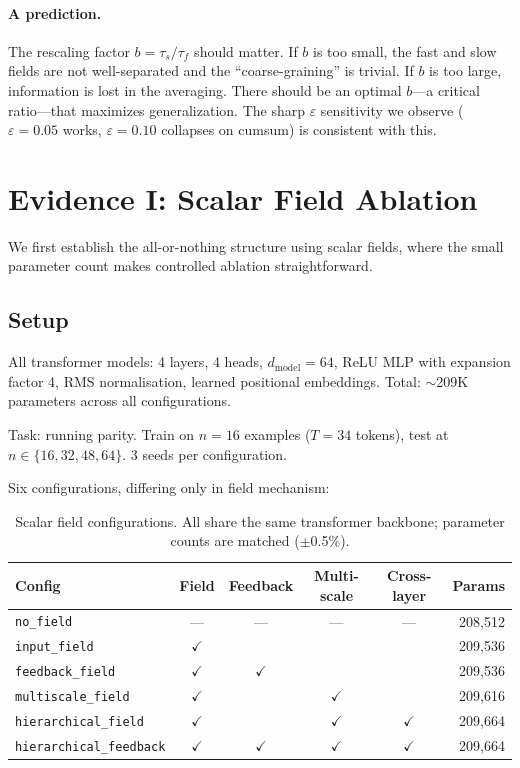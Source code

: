 \documentclass[11pt,a4paper]{article}
\newcommand{\evap}{\varepsilon}
\begin{document}
\paragraph{A prediction.}  The rescaling factor
$b = \tau_s/\tau_f$ should matter.  If $b$ is too small, the fast
and slow fields are not well-separated and the ``coarse-graining''
is trivial.  If $b$ is too large, information is lost in the
averaging.  There should be an optimal $b$---a critical ratio---that
maximizes generalization.  The sharp $\evap$ sensitivity we observe
($\evap = 0.05$ works, $\evap = 0.10$ collapses on cumsum) is
consistent with this.


\section{Evidence I: Scalar Field Ablation}
\label{sec:scalar-ablation}

We first establish the all-or-nothing structure using scalar fields,
where the small parameter count makes controlled ablation
straightforward.

\subsection{Setup}

All transformer models: 4 layers, 4 heads, $d_{\mathrm{model}} = 64$,
ReLU MLP with expansion factor 4, RMS normalisation, learned
positional embeddings.  Total: $\sim$209K parameters across all
configurations.

Task: running parity.  Train on $n = 16$ examples ($T = 34$ tokens),
test at $n \in \{16, 32, 48, 64\}$.  3 seeds per configuration.

Six configurations, differing only in field mechanism:

\begin{table}[h]
\centering
\caption{Scalar field configurations.  All share the same transformer
  backbone; parameter counts are matched ($\pm$0.5\%).}
\label{tab:scalar-configs}
\begin{tabular}{@{}lccccr@{}}
\toprule
Config & Field & Feedback & Multi-scale & Cross-layer & Params \\
\midrule
\texttt{no\_field}     & --- & --- & --- & --- & 208,512 \\
\texttt{input\_field}  & $\checkmark$ & & & & 209,536 \\
\texttt{feedback\_field} & $\checkmark$ & $\checkmark$ & & & 209,536 \\
\texttt{multiscale\_field} & $\checkmark$ & & $\checkmark$ & & 209,616 \\
\texttt{hierarchical\_field} & $\checkmark$ & & $\checkmark$ & $\checkmark$ & 209,664 \\
\texttt{hierarchical\_feedback} & $\checkmark$ & $\checkmark$ & $\checkmark$ & $\checkmark$ & 209,664 \\
\bottomrule
\end{tabular}
\end{table}
\end{document}
